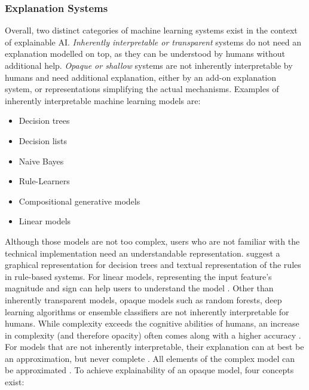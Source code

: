 \subsubsection{Explanation Systems}
Overall, two distinct categories of machine learning systems exist in the context of explainable AI. \textit{Inherently interpretable or transparent} systems do not need an explanation modelled on top, as they can be understood by humans without additional help. \textit{Opaque or shallow} systems are not inherently interpretable by humans and need additional explanation, either by an add-on explanation system, or representations simplifying the actual mechanisms.\newline
Examples of inherently interpretable machine learning models are:
\begin{itemize}
	\item Decision trees \cite{biran2017explanation, kotsiantis2007supervised}
	\item Decision lists \cite{biran2017explanation}
	\item Naive Bayes \cite{kotsiantis2007supervised}
	\item Rule-Learners \cite{guidotti2018survey, kotsiantis2007supervised}
	\item Compositional generative models \cite{biran2017explanation}
	\item Linear models \cite{guidotti2018survey}
\end{itemize}
Although those models are not too complex, users who are not familiar with the technical implementation need an understandable representation. \cite{guidotti2018survey} suggest a graphical representation for decision trees and textual representation of the rules in rule-based systems. For linear models, representing the input feature's magnitude and sign can help users to understand the model \cite{guidotti2018survey}.\newline
Other than inherently transparent models, opaque models such as random forests, deep learning algorithms or ensemble classifiers are not inherently interpretable for humans. While complexity exceeds the cognitive abilities of humans, an increase in complexity (and therefore opacity) often comes along with a higher accuracy \cite{chen2018learning, richardson2018survey}. For models that are not inherently interpretable, their explanation can at best be an approximation, but never complete \cite{miller2017explanation}. All elements of the complex model can be approximated \cite{miller2017explanation}. To achieve explainability of an opaque model, four concepts exist:
